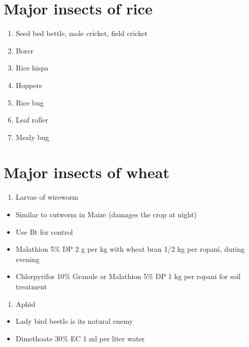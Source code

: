 \documentclass[
  openany]{book}
\providecommand{\tightlist}{%
  \setlength{\itemsep}{0pt}\setlength{\parskip}{0pt}}
\begin{document}
\hypertarget{major-insects-of-rice}{%
\section{Major insects of rice}\label{major-insects-of-rice}}

\begin{enumerate}
\def\labelenumi{\arabic{enumi}.}
\tightlist
\item
  Seed bed bettle, mole cricket, field cricket
\item
  Borer
\item
  Rice hispa
\item
  Hoppers
\item
  Rice bug
\item
  Leaf roller
\item
  Mealy bug
\end{enumerate}

\hypertarget{major-insects-of-wheat}{%
\section{Major insects of wheat}\label{major-insects-of-wheat}}

\begin{enumerate}
\def\labelenumi{\arabic{enumi}.}
\tightlist
\item
  Larvae of wireworm
\end{enumerate}

\begin{itemize}
\tightlist
\item
  Similar to cutworm in Maize (damages the crop at night)
\item
  Use Bt for control
\item
  Malathion 5\% DP 2 g per kg with wheat bran 1/2 kg per ropani, during evening
\item
  Chlorpyrifos 10\% Granule or Malathion 5\% DP 1 kg per ropani for soil treatment
\end{itemize}

\begin{enumerate}
\def\labelenumi{\arabic{enumi}.}
\setcounter{enumi}{1}
\tightlist
\item
  Aphid
\end{enumerate}

\begin{itemize}
\tightlist
\item
  Lady bird beetle is its natural enemy
\item
  Dimethoate 30\% EC 1 ml per liter water
\end{itemize}
\end{document}
